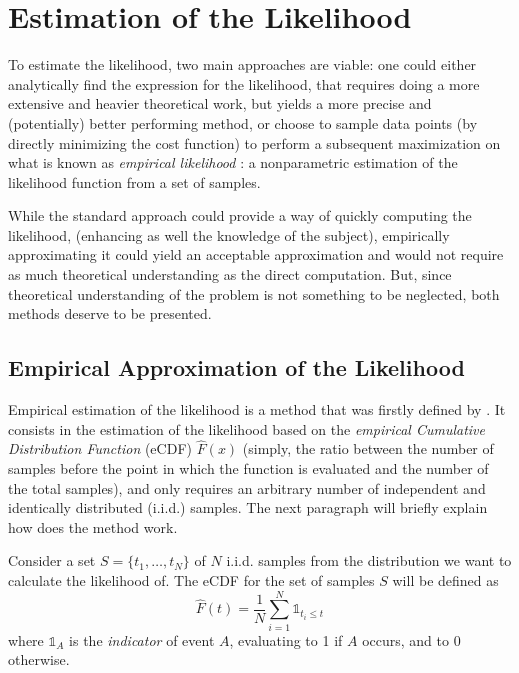 \section{Estimation of the Likelihood}
\label{sec:lik_est}
To estimate the likelihood, two main approaches are viable:
one could either analytically find the expression for the likelihood,
that requires doing a more extensive and heavier theoretical work,
but yields a more precise and (potentially) better performing method,
or choose to sample data points (by directly minimizing the cost function)
to perform a subsequent maximization on what is known as \textit{empirical likelihood} \parencite{10.1093/biomet/75.2.237}:
a nonparametric estimation of the likelihood function from a set of samples.

While the standard approach could provide a way of quickly computing the likelihood,
(enhancing as well the knowledge of the subject),
empirically approximating it could yield an acceptable approximation and would not require as much theoretical understanding as the direct computation.
But, since theoretical understanding of the problem is not something to be neglected,
both methods deserve to be presented.

\subsection{Empirical Approximation of the Likelihood}
\label{sec:emp_approx_lik}

Empirical estimation of the likelihood is a method that was firstly defined by \textcite{10.1093/biomet/75.2.237}.
It consists in the estimation of the likelihood based on the \textit{empirical Cumulative Distribution Function} (eCDF)  \(\hat{F}(x)\) (simply, the ratio between the number of samples before the point in which the function is evaluated and the number of the total samples),
and only requires an arbitrary number of independent and identically distributed (i.i.d.) samples.
The next paragraph will briefly explain how does the method work.

Consider a set \(S = \{t_1, \dots, t_N\}\) of \(N\) i.i.d. samples from the distribution we want to calculate the likelihood of.
The eCDF for the set of samples \(S\) will be defined as
\begin{equation}
  \label{eq:emp_cdf}
  \hat{F}(t) = \frac{1}{N}\sum_{i = 1}^N \mathbb{1}_{t_i \leq t}
\end{equation}
where \(\mathbb{1}_A\) is the \textit{indicator} of event \(A\),
evaluating to 1 if \(A\) occurs, and to 0 otherwise.

